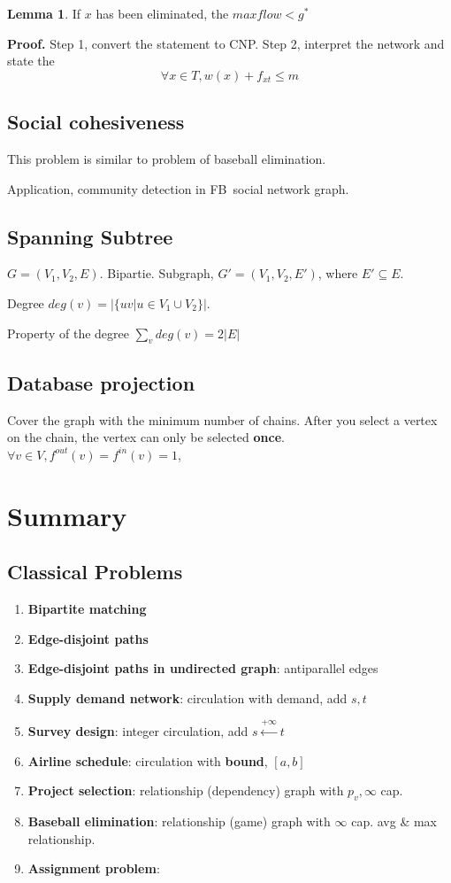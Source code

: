 \documentclass[a4paper]{report}
\theoremstyle{definition}
\newtheorem{lem}{Lemma}[section]
\begin{document}
\begin{lem}
If $x$ has been eliminated, the $maxflow < g^*$
\end{lem}

\textbf{Proof.} Step 1, convert the statement to CNP. Step 2, interpret the network and state the $$\forall x \in T, w(x)+f_{xt}\leq m$$

\subsection{Social cohesiveness}
This problem is similar to problem of baseball elimination.

Application, community detection in FB\ social network graph.

\subsection{Spanning Subtree}
$G=(V_1, V_2, E)$. Bipartie. Subgraph, $G'=(V_1, V_2, E')$, where $E'\subseteq E$.

Degree $deg(v)=|\{uv|u\in V_1\cup V_2\}|$.

Property of the degree $\sum_v deg(v)=2|E|$

\subsection{Database projection}
Cover the graph with the minimum number of chains. After you select a vertex on the chain, the vertex can only be selected \textbf{once}. $\forall v\in V, f^{out}(v)=f^{in}(v)=1$,

\section{Summary}
\subsection{Classical Problems}
\begin{enumerate}
\item \textbf{Bipartite matching} 
\item \textbf{Edge-disjoint paths }
\item \textbf{Edge-disjoint paths in undirected graph}: antiparallel edges
\item \textbf{Supply demand network}: circulation with demand, add $s, t$
\item \textbf{Survey design}: integer circulation, add $s \overset{+\infty}{\leftarrow} t$
\item \textbf{Airline schedule}: circulation with \textbf{bound}, $[a, b]$
\item \textbf{Project selection}: relationship (dependency) graph with $p_v, \infty$ cap. 
\item \textbf{Baseball elimination}: relationship (game) graph with $\infty$ cap. avg \& max relationship. 
\item \textbf{Assignment problem}: 
\end{enumerate}
\end{document}
